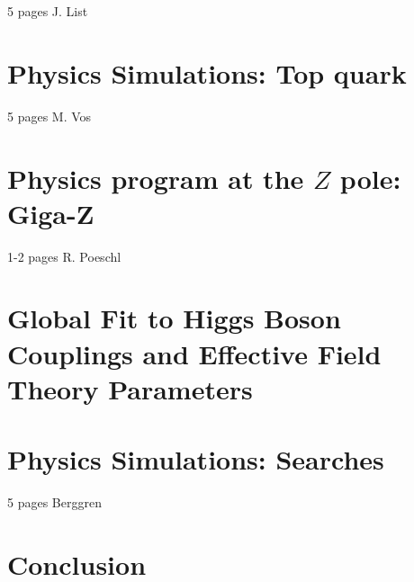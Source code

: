 \documentclass[%
 reprint,
nofootinbib,
 amsmath,amssymb,
 aps,
]{revtex4-1}
\begin{document}
  5 pages J. List
  
  



\section{\label{sec:top}Physics Simulations: Top quark}

  5 pages M. Vos
  
  


\section{\label{sec:gigaz} Physics program at the $Z$ pole:  Giga-Z}


  1-2 pages R. Poeschl
  
  


\section{\label{sec:global}Global Fit to Higgs Boson Couplings and Effective Field Theory Parameters}

  



\section{\label{sec:searches}Physics Simulations: Searches }


  5 pages Berggren
  
 

\section{\label{sec:conclusion}Conclusion}




%

\end{document}
